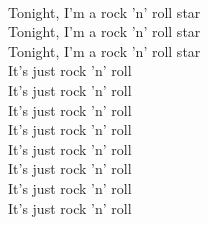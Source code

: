 \\
Tonight, I'm a rock 'n' roll star \\
Tonight, I'm a rock 'n' roll star \\
Tonight, I'm a rock 'n' roll star \\
It's just rock 'n' roll \\
It's just rock 'n' roll \\
It's just rock 'n' roll \\
It's just rock 'n' roll \\
It's just rock 'n' roll \\
It's just rock 'n' roll \\
It's just rock 'n' roll \\
It's just rock 'n' roll \\
